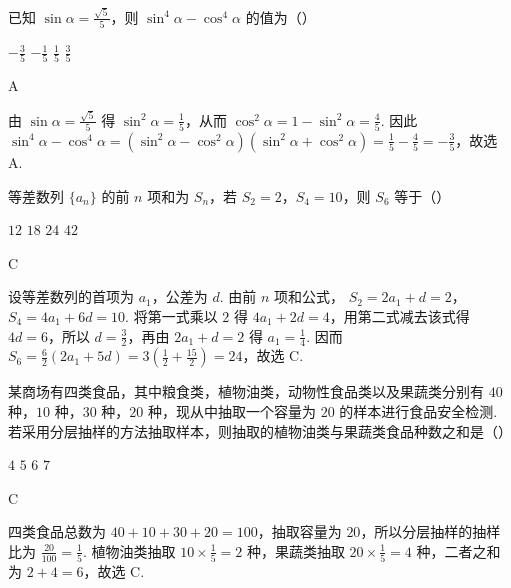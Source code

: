 \begin{problem}
已知 \(\sin \alpha = \frac{\sqrt{5}}{5}\)，则 \(\sin^4 \alpha - \cos^4 \alpha\) 的值为（\quad）

\choices
    {\(-\frac{3}{5}\)}
    {\(-\frac{1}{5}\)}
    {\(\frac{1}{5}\)}
    {\(\frac{3}{5}\)}
\end{problem}

\begin{answer}
A
\end{answer}

\begin{solution}
由 \(\sin\alpha=\frac{\sqrt5}{5}\) 得 \(\sin^2\alpha=\frac15\)，从而 \(\cos^2\alpha=1-\sin^2\alpha=\frac45\). 因此 \(\sin^4\alpha-\cos^4\alpha=(\sin^2\alpha-\cos^2\alpha)(\sin^2\alpha+\cos^2\alpha)=\frac15-\frac45=-\frac35\)，故选 A.
\end{solution}

\begin{problem}
等差数列 \(\{a_n\}\) 的前 \(n\) 项和为 \(S_n\)，若 \(S_2 = 2\)，\(S_4 = 10\)，则 \(S_6\) 等于（\quad）

\choices
    {\(12\)}
    {\(18\)}
    {\(24\)}
    {\(42\)}
\end{problem}

\begin{answer}
C
\end{answer}

\begin{solution}
设等差数列的首项为 \(a_1\)，公差为 \(d\). 由前 \(n\) 项和公式，
\(S_2=2a_1+d=2\)，\(S_4=4a_1+6d=10\). 将第一式乘以 \(2\) 得 \(4a_1+2d=4\)，用第二式减去该式得 \(4d=6\)，所以 \(d=\frac32\)，再由 \(2a_1+d=2\) 得 \(a_1=\frac14\). 因而
\(S_6=\frac{6}{2}\left(2a_1+5d\right)=3\left(\frac12+\frac{15}{2}\right)=24\)，故选 C.
\end{solution}

\begin{problem}
某商场有四类食品，其中粮食类，植物油类，动物性食品类以及果蔬类分别有 \(40\) 种，\(10\) 种，\(30\) 种，\(20\) 种，现从中抽取一个容量为 \(20\) 的样本进行食品安全检测. 若采用分层抽样的方法抽取样本，则抽取的植物油类与果蔬类食品种数之和是（\quad）

\choices
    {\(4\)}
    {\(5\)}
    {\(6\)}
    {\(7\)}
\end{problem}

\begin{answer}
C
\end{answer}

\begin{solution}
四类食品总数为 \(40+10+30+20=100\)，抽取容量为 \(20\)，所以分层抽样的抽样比为 \(\frac{20}{100}=\frac15\). 植物油类抽取 \(10\times\frac15=2\) 种，果蔬类抽取 \(20\times\frac15=4\) 种，二者之和为 \(2+4=6\)，故选 C.
\end{solution}

